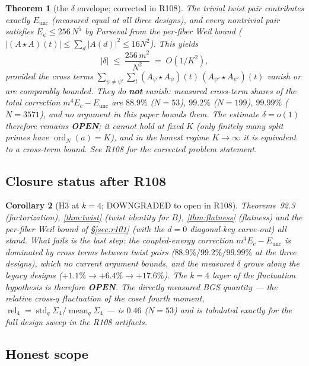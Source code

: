 \documentclass[11pt,reqno]{amsart}
\newtheorem{theorem}{Theorem}[section]
\newtheorem{corollary}[theorem]{Corollary}
\theoremstyle{definition}
\begin{document}
\begin{theorem}[the $\delta$ envelope; corrected in R108]
\label{thm:delta}
The trivial twist pair contributes exactly $E_{\mathrm{unc}}$ (measured
equal at all three designs), and every nontrivial pair satisfies
$E_{\psi} \le 256\,N^5$ by Parseval from the per-fiber Weil bound
($|(A \star A)(t)| \le \sum_d |A(d)|^2 \le 16 N^2$).
This yields
\[
  |\delta| \;\le\; \frac{256\,m^2}{N^2} \;=\; O(1/K^2),
\]
\emph{provided} the cross terms
$\sum_{\psi \ne \psi'} \sum_t (A_\psi \star A_\psi)(t)\,
(A_{\psi'} \star A_{\psi'})(t)$
vanish or are comparably bounded.  They do \textbf{not} vanish: measured
cross-term shares of the total correction $m^4 E_c - E_{\mathrm{unc}}$
are $88.9\%$ ($N{=}53$), $99.2\%$ ($N{=}199$), $99.99\%$ ($N{=}3571$),
and no argument in this paper bounds them.  The estimate
$\delta = o(1)$ therefore remains \textbf{OPEN}; it cannot hold at fixed
$K$ (only finitely many split primes have $\operatorname{ord}_N(a) = K$),
and in the honest regime $K \to \infty$ it is equivalent to a cross-term
bound.  See R108 for the corrected problem statement.
\end{theorem}

\subsection{Closure status after R108}

\begin{corollary}[H3 at $k = 4$; DOWNGRADED to open in R108]
\label{cor:h3closed}
Theorems~92.3 (factorization), \ref{thm:twist} (twist identity for
$B$), \ref{thm:flatness} (flatness) and the per-fiber Weil bound of
\S\ref{sec:r101} (with the $d = 0$ diagonal-key carve-out) all stand.
What fails is the last step: the coupled-energy correction
$m^4 E_c - E_{\mathrm{unc}}$ is dominated by cross terms between twist
pairs ($88.9\%/99.2\%/99.99\%$ at the three designs), which no current
argument bounds, and the measured $\delta$ grows along the legacy
designs ($+1.1\% \to +6.4\% \to +17.6\%$).  The $k{=}4$ layer of the
fluctuation hypothesis is therefore \textbf{OPEN}.  The directly
measured BGS quantity --- the relative cross-$q$ fluctuation of the
coset fourth moment, $\operatorname{rel}_4 = \operatorname{std}_q
\Sigma_4 / \operatorname{mean}_q \Sigma_4$ --- is $0.46$ ($N{=}53$) and
is tabulated exactly for the full design sweep in the R108 artifacts.
\end{corollary}

\subsection{Honest scope}
\end{document}

